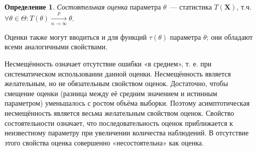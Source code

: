\documentclass[oneside,final,14pt]{extreport}
\theoremstyle{plain}
\theoremstyle{definition}
\newtheorem*{defn}{Определение}
\theoremstyle{named}
\begin{document}
\begin{defn}
{\it Состоятельная оценка} параметра $\theta$~--- статистика $T(\mathbf{X})$, т.ч. $\forall \theta \in \Theta: T(\theta) \xrightarrow[n \rightarrow \infty]{p} \theta$.
\end{defn}

Оценки также могут вводиться и для функций $\tau(\theta)$ параметра $\theta$; они обладают всеми аналогичными свойствами.

Несмещённость означает отсутствие ошибки «в среднем», т. е. при систематическом использовании данной оценки. Несмещённость является желательным, но не обязательным свойством оценок. Достаточно, чтобы смещение оценки (разница между её средним значением и истинным параметром) уменьшалось с ростом объёма выборки. Поэтому асимптотическая несмещённость является весьма желательным свойством оценок. Свойство состоятельности означает, что последовательность оценок приближается к неизвестному параметру при увеличении количества наблюдений. В отсутствие этого свойства оценка совершенно «несостоятельна» как оценка.
\end{document}
